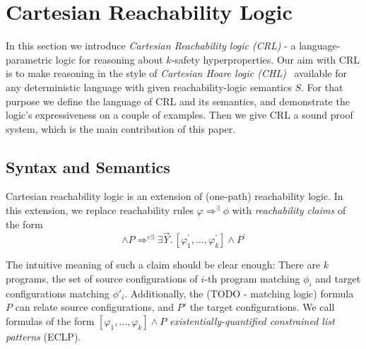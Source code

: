 \section{Cartesian Reachability Logic}
In this section we introduce \emph{Cartesian Reachability logic (CRL)} - a language-parametric logic for reasoning
about $k$-safety hyperproperties.
Our aim with CRL is to make reasoning in the style of \emph{Cartesian Hoare logic (CHL)}~\cite{SousaD16} available for any
deterministic language with given reachability-logic semantics $S$.
For that purpose we define the language of CRL and its semantics, and demonstrate the logic's expressiveness
on a couple of examples.
Then we give CRL a sound proof system, which is the main contribution of this paper.


\subsection{Syntax and Semantics}

Cartesian reachability logic is an extension of (one-path) reachability
logic. In this extension, we replace reachability rules $\varphi
\Rightarrow^{\exists} \phi$ with  \emph{reachability claims} of the form
\begin{equation*}
  [\varphi_1,\ldots,\varphi_k] \land P
  \Rightarrow^{c\exists} \exists \vec{Y}.\, [\varphi^\prime_1,\ldots,\varphi^\prime_k] \land P^\prime
\end{equation*}

The intuitive meaning of such a claim should be clear enough: There are $k$
programs, the set of source configurations of $i$-th program matching $\phi_i$
and target configurations matching $\phi'_i$. Additionally, the (TODO -
matching logic) formula $P$ can relate source configurations, and $P'$ the
target configurations. We call formulas of the form   $ [\varphi_1,\ldots,\varphi_k] \land P$
\emph{existentially-quantified constrained list patterns} (ECLP). 



